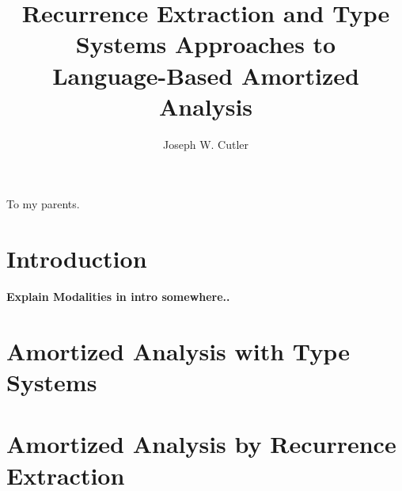 \documentclass[draft]{westhesis}
\title{Recurrence Extraction and Type Systems Approaches to\\ Language-Based Amortized Analysis}
\author{Joseph W. Cutler}
\begin{document}
\begin{abstract}
\end{abstract}

\begin{dedication}
To my parents.
\end{dedication}

\begin{acknowledgements}
\end{acknowledgements}


\setcounter{tocdepth}{2}
\tableofcontents
\mainmatter

\chapter{Introduction}
%
\textbf{Explain Modalities in intro somewhere..}

\chapter{Amortized Analysis with Type Systems}
\label{chap:lambda-amor}



\chapter{Amortized Analysis by Recurrence Extraction}
\label{chap:rec-extr}




\end{document}
